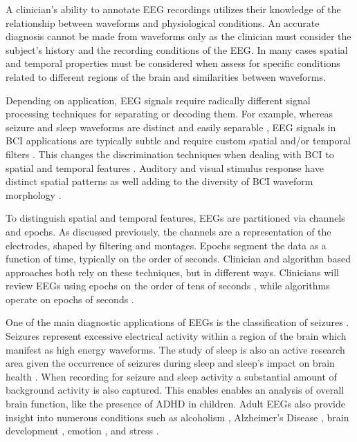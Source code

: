 A clinician's ability to annotate \ac{EEG} recordings utilizes their knowledge of the relationship between waveforms and physiological conditions. An accurate diagnosis cannot be made from waveforms only as the clinician must consider the subject's history and the recording conditions of the \ac{EEG}. In many cases spatial and temporal properties must be considered when assess for specific conditions related to different regions of the brain and similarities between waveforms.

Depending on application, \ac{EEG} signals require radically different signal processing techniques for separating or decoding them. For example, whereas seizure and sleep waveforms are distinct and easily separable \cite{Markand2003}, EEG signals in BCI applications are typically subtle and require custom spatial and/or temporal filters \cite{Makeig2012}. This changes the discrimination techniques when dealing with \ac{BCI} to spatial and temporal features \cite{Blankertz2007a,Kasabov2015}. Auditory and visual stimulus response \cite{Picton1992} have distinct spatial patterns as well adding to the diversity of \ac{BCI} waveform morphology \cite{Kindermans2014}.

To distinguish spatial and temporal features, \acp{EEG} are partitioned via channels and epochs. As discussed previously, the channels are a representation of the electrodes, shaped by filtering and montages. Epochs segment the data as a function of time, typically on the order of seconds. Clinician and algorithm based approaches both rely on these techniques, but in different ways. Clinicians will review \acp{EEG} using epochs on the order of tens of seconds \cite{Warby2014, Silber2007}, while algorithms operate on epochs of seconds \cite{Wulsin2011,Kindermans2014}.

One of the main diagnostic applications of \acp{EEG} is the classification of seizures \cite{Wulsin2011}. Seizures represent excessive electrical activity within a region of the brain which manifest as high energy waveforms. The study of sleep is also an active research area given the occurrence of seizures during sleep and sleep's impact on brain health \cite{Radha2014}. When recording for seizure and sleep activity a substantial amount of background activity is also captured. This enables enables an analysis of overall brain function, like the presence of \ac{ADHD} in children\cite{Loo2008a}. Adult \acp{EEG} also provide insight into numerous conditions such as alcoholism \cite{Porjesz2005}, Alzheimer's Disease \cite{Jeong2004}, brain development \cite{Segalowitz2010}, emotion \cite{Coan2004}, and stress \cite{Lupien2007}.

